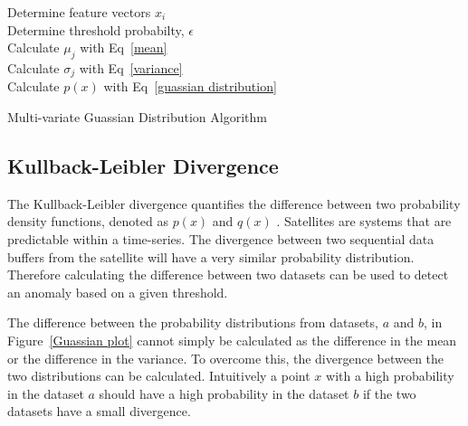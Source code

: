 \begin{algorithm}
	
	
	\Indm
	\Indp
	\BlankLine
	
	Determine feature vectors $x_i$ \\
	Determine threshold probabilty, $\epsilon$ \\
	Calculate $\mu_j$ with Eq~\ref{mean} \\
	Calculate $\sigma_j$ with Eq~\ref{variance} \\
	Calculate $p(x)$ with Eq~\ref{guassian distribution} \\
	
	\caption[Multi-variate Guassian Distribution]{Multi-variate Guassian Distribution Algorithm}
	\label{alg}
\end{algorithm}

\subsection{Kullback-Leibler Divergence}
The Kullback-Leibler divergence quantifies the difference between two probability density functions, denoted as $p(x)$ and $q(x)$ \cite{hershey2007approximating}. Satellites are systems that are predictable within a time-series. The divergence between two sequential data buffers from the satellite will have a very similar probability distribution. Therefore calculating the difference between two datasets can be used to detect an anomaly based on a given threshold.

The difference between the probability distributions from datasets, $a$ and $b$, in Figure~\ref{Guassian plot} cannot simply be calculated as the difference in the mean or the difference in the variance. To overcome this, the divergence between the two distributions can be calculated. Intuitively a point $x$ with a high probability in the dataset $a$ should have a high probability in the dataset $b$ if the two datasets have a small divergence. 

